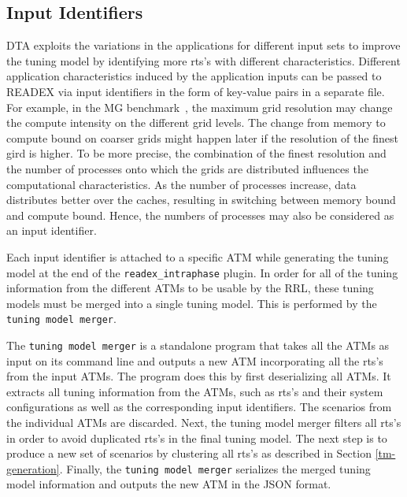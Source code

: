\subsection{Input Identifiers} \label{sec:input}

DTA exploits the variations in the applications for different input sets to improve the tuning model by identifying more rts's with different characteristics. Different application characteristics induced by the application inputs can be passed to READEX via input identifiers in the form of key-value pairs in a separate file. For example, in the MG benchmark~\cite{npb}, the maximum grid resolution may change the compute intensity on the different grid levels. The change from memory to compute bound on coarser grids might happen later if the resolution of the finest gird is higher. To be more precise, the combination of the finest resolution and the number of processes onto which the grids are distributed influences the computational characteristics. As the number of processes increase, data distributes better over the caches, resulting in switching between memory bound and compute bound. Hence, the numbers of processes may also be considered as an input identifier. 

Each input identifier is attached to a specific ATM while generating the tuning model at the end of the \texttt{readex\_intraphase} plugin. In order for all of the tuning information from the different ATMs to be usable by the RRL, these tuning models must be merged into a single tuning model. This is performed by the \texttt{tuning model merger}.

The \texttt{tuning model merger} is a standalone program that takes all the ATMs as input on its command line and outputs a new ATM incorporating all the rts's from the input ATMs. The program does this by first deserializing all ATMs. It extracts all tuning information from the ATMs, such as rts's and their system configurations as well as the corresponding input identifiers. The scenarios from the individual ATMs are discarded. Next, the tuning model merger filters all rts's in order to avoid duplicated rts's in the final tuning model. The next step is to produce a new set of scenarios by clustering all rts's as described in Section \ref{tm-generation}. Finally, the \texttt{tuning model merger} serializes the merged tuning model information and outputs the new ATM in the JSON format.
